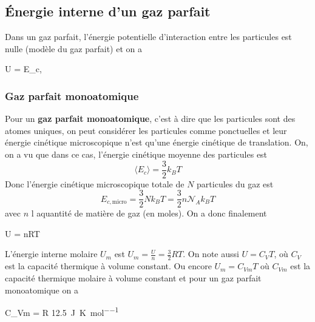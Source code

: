 \documentclass{cours}
\begin{document}
\subsection{Énergie interne d'un gaz parfait}%
\label{sub:energie_interne_d_un_gaz_parfait}

Dans un gaz parfait, l'énergie potentielle d'interaction entre les particules est nulle (modèle du gaz parfait) et on a 
\begin{eqencadre}
  U = E_{c, }
\end{eqencadre}

\subsubsection{Gaz parfait monoatomique}%
\label{ssub:gaz_parfait_monoatomique}

Pour un \textbf{gaz parfait monoatomique}, c'est à dire que les particules sont des atomes uniques, on peut considérer les particules comme ponctuelles et leur énergie cinétique microscopique n'est qu'une énergie cinétique de translation. On, on a vu que dans ce cas, l'énergie cinétique moyenne des particules est 
\begin{equation}
  \langle E_c \rangle = \frac{3}{2}k_B T
\end{equation}
Donc l'énergie cinétique microscopique totale de $N$ particules du gaz est
\begin{equation}
  E_{c,\text{micro}} = \frac{3}{2}Nk_BT = \frac{3}{2}n\mathcal{N}_Ak_B T
\end{equation}
%
avec $n$ l aquantité de matière de gaz (en moles). On a donc finalement 
\begin{eqencadre}
  U = nRT
\end{eqencadre}

L'énergie interne molaire $U_m$ est $U_m=\frac{U}{n}=\frac{3}{2}RT$. On note aussi $U = C_V T$, où $C_V$ est la capacité thermique à volume constant. Ou encore $U_m = C_{Vm}T$ où $C_{Vm}$ est la capacité thermique molaire à volume constant et pour un gaz parfait monoatomique on a 
\begin{eqencadre}
  C_{Vm} = R \approx \SI{12.5}{\joule\per\kelvin\per\mole}
\end{eqencadre}
\end{document}
